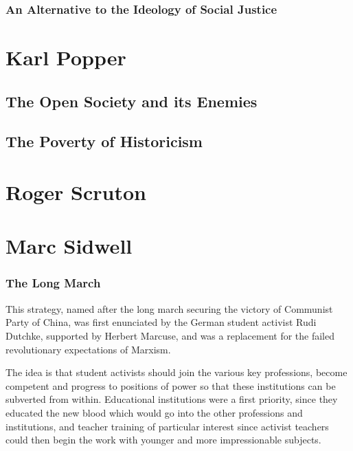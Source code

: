 \documentclass[10pt,titlepage]{book}
\begin{document}
\subsubsection{An Alternative to the Ideology of Social Justice}

\section{Karl Popper}

\subsection{The Open Society and its Enemies}

\cite{popperOSE1,popperOSE2}

\subsection{The Poverty of Historicism}

\cite{popperPOH}

\section{Roger Scruton}

\cite{scruton85,scruton15}


\section{Marc Sidwell}\label{Sidwell}

\subsubsection{The Long March \cite{sidwell-long}}

This strategy, named after the long march securing the victory of Communist Party of China, was first enunciated by the German student activist Rudi Dutchke, supported by Herbert Marcuse, and was a replacement for the failed revolutionary expectations of Marxism.

The idea is that student activists should join the various key professions, become competent and progress to positions of power so that these institutions can be subverted from within.
Educational institutions were a first priority, since they educated the new blood which would go into the other professions and institutions, and teacher training of particular interest since activist teachers could then begin the work with younger and more impressionable subjects.
\end{document}
